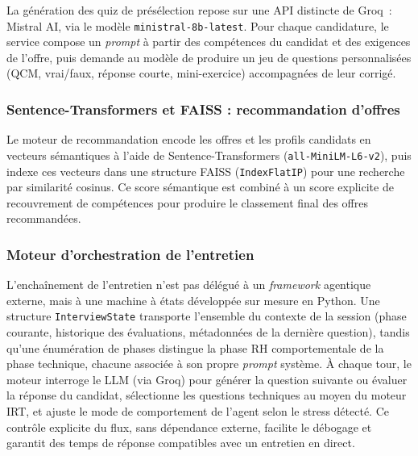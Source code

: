 La génération des quiz de présélection repose sur une API distincte de Groq~: Mistral AI, via le modèle \texttt{ministral-8b-latest}. Pour chaque candidature, le service compose un \textit{prompt} à partir des compétences du candidat et des exigences de l'offre, puis demande au modèle de produire un jeu de questions personnalisées (QCM, vrai/faux, réponse courte, mini-exercice) accompagnées de leur corrigé.


\subsubsection{Sentence-Transformers et FAISS : recommandation d'offres}

Le moteur de recommandation encode les offres et les profils candidats en vecteurs sémantiques à l'aide de Sentence-Transformers (\texttt{all-MiniLM-L6-v2}), puis indexe ces vecteurs dans une structure FAISS (\texttt{IndexFlatIP}) pour une recherche par similarité cosinus. Ce score sémantique est combiné à un score explicite de recouvrement de compétences pour produire le classement final des offres recommandées.


\subsubsection{Moteur d'orchestration de l'entretien}

L'enchaînement de l'entretien n'est pas délégué à un \textit{framework} agentique externe, mais à une machine à états développée sur mesure en Python. Une structure \texttt{InterviewState} transporte l'ensemble du contexte de la session (phase courante, historique des évaluations, métadonnées de la dernière question), tandis qu'une énumération de phases distingue la phase RH comportementale de la phase technique, chacune associée à son propre \textit{prompt} système. À chaque tour, le moteur interroge le LLM (via Groq) pour générer la question suivante ou évaluer la réponse du candidat, sélectionne les questions techniques au moyen du moteur IRT, et ajuste le mode de comportement de l'agent selon le stress détecté. Ce contrôle explicite du flux, sans dépendance externe, facilite le débogage et garantit des temps de réponse compatibles avec un entretien en direct.

